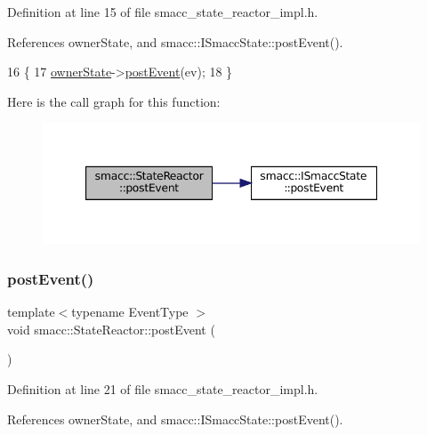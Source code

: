 Definition at line 15 of file smacc\+\_\+state\+\_\+reactor\+\_\+impl.\+h.



References owner\+State, and smacc\+::\+I\+Smacc\+State\+::post\+Event().


\begin{DoxyCode}
16 \{
17     \hyperlink{classsmacc_1_1StateReactor_aabd30af9412a8fea9ec5906f173d9d4a}{ownerState}->\hyperlink{classsmacc_1_1ISmaccState_acef404ab3766ddf2892e8dad14a4a7cf}{postEvent}(ev);
18 \}
\end{DoxyCode}
Here is the call graph for this function\+:
\nopagebreak
\begin{figure}[H]
\begin{center}
\leavevmode
\includegraphics[width=347pt]{classsmacc_1_1StateReactor_a06303bdf908d04d5a6eb5f63131e68bd_cgraph}
\end{center}
\end{figure}
\mbox{\label{classsmacc_1_1StateReactor_a3d149851c5540110a29e9a7b3228239d}} 
\subsubsection{\texorpdfstring{post\+Event()}{postEvent()}\hspace{0.1cm}{\footnotesize\ttfamily [2/2]}}
{\footnotesize\ttfamily template$<$typename Event\+Type $>$ \\
void smacc\+::\+State\+Reactor\+::post\+Event (\begin{DoxyParamCaption}{ }\end{DoxyParamCaption})}



Definition at line 21 of file smacc\+\_\+state\+\_\+reactor\+\_\+impl.\+h.



References owner\+State, and smacc\+::\+I\+Smacc\+State\+::post\+Event().


